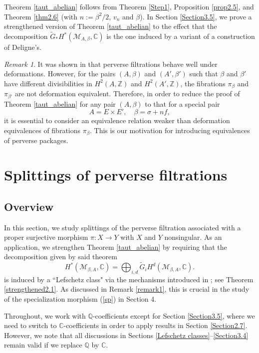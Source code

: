\documentclass[11pt]{amsart}
\theoremstyle{plain}
\theoremstyle{definition}
\theoremstyle{remark}
\newtheorem{rmk}[thm]{Remark}
\newcommand{\BC}{{\mathbb{C}}}
\newcommand{\BQ}{{\mathbb{Q}}}
\newcommand{\BZ}{{\mathbb{Z}}}
\newcommand{\CM}{{\mathcal M}}
\begin{document}
Theorem \ref{taut_abelian} follows from Theorem \ref{Step1}, Proposition \ref{prop2.5}, and Theorem \ref{thm2.6}
{(with $n:=\beta^2/2$, $v_n$ and $\beta$)}. In Section \ref{Section3.5}, we prove a strengthened version of Theorem \ref{taut_abelian} to the effect that  the decomposition $\tilde{G}_*H^*(\CM_{A,\beta}, \BC)$ is the one  induced by a variant of a construction of Deligne's. 

\begin{rmk}\label{remark2.8}
It was shown in \cite{dCM} that perverse filtrations behave well under deformations. However, for the pairs $(A, \beta)$ and $(A',\beta')$ such that $\beta$ and $\beta'$ have different divisibilities in $H^2(A, \BZ)$ and $H^2(A',\BZ)$, the fibrations $\pi_\beta$ and $\pi_{\beta'}$ are not deformation equivalent.
Therefore,  in order to reduce the proof of Theorem \ref{taut_abelian} for any pair $(A,\beta)$ to that for a special pair
\[
A= E \times E', \quad \beta = \sigma +n f,
\] 
it is essential to consider an equivalence relation weaker than deformation equivalences of fibrations $\pi_\beta$. This is our motivation for introducing  equivalences of perverse packages. 
\end{rmk}


\section{Splittings of perverse filtrations}

\subsection{Overview}
In this section, we study splittings of the perverse filtration associated with a proper surjective morphism $\pi: X\to Y$ with $X$ and $Y$ nonsingular. As an application, we strengthen Theorem \ref{taut_abelian} by requiring that the decomposition  {given by said theorem}
\begin{equation}\label{decomp6}
H^\ast(\CM_{\beta, A}, \BC) = \bigoplus_{i,d} \widetilde{G}_iH^d(\CM_{\beta, A}, \BC).
\end{equation}
is induced by a ``Lefschetz class" via the mechanisms introduced in \cite{D, dC, dCM4}; see Theorem \ref{strengthened2.1}. As discussed in Remark \ref{remark1}, this is crucial in the study of the specialization morphism (\ref{sp}) in Section 4. 

Throughout, we work with $\BQ$-coefficients except for Section \ref{Section3.5}, where we need to switch to $\BC$-coefficients in order to apply results in Section \ref{Section2.7}. However, we note that all discussions in 
Sections \ref{Lefschetz classes}--\ref{Section3.4} remain valid if we replace $\BQ$ by $\BC$.
\end{document}
